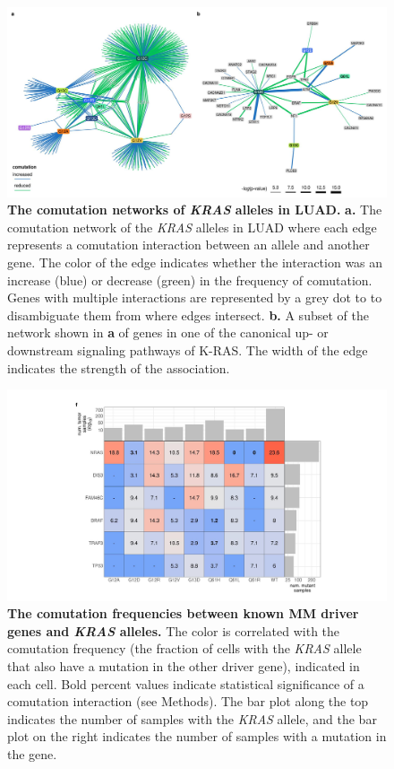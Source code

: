 \documentclass[english, 10pt, letterpaper]{article}
\newcommand{\KRAS}{\emph{KRAS}}
\newcommand{\kras}{K-RAS}
\begin{document}
\begin{figure}[h!]
\centering
\includegraphics[width=180mm]{figures/Supp_Fig_3.jpeg}
\caption{
    \textbf{The comutation networks of \KRAS{} alleles in LUAD.}
    \textbf{a.} The comutation network of the \KRAS{} alleles in LUAD where each edge represents a comutation interaction between an allele and another gene. The color of the edge indicates whether the interaction was an increase (blue) or decrease (green) in the frequency of comutation. Genes with multiple interactions are represented by a grey dot to to disambiguate them from where edges intersect.
    \textbf{b.} A subset of the network shown in \textbf{a} of genes in one of the canonical up- or downstream signaling pathways of \kras{}. The width of the edge indicates the strength of the association.
}
\label{sfig:luad-comutation-network}
\end{figure}
\newpage


\begin{figure}[h!]
\centering
\includegraphics[width=180mm]{figures/Supp_Fig_4.jpeg}
\caption{
    \textbf{The comutation frequencies between known MM driver genes and \KRAS{} alleles.} The color is correlated with the comutation frequency (the fraction of cells with the \KRAS{} allele that also have a mutation in the other driver gene), indicated in each cell. Bold percent values indicate statistical significance of a comutation interaction (see Methods). The bar plot along the top indicates the number of samples with the \KRAS{} allele, and the bar plot on the right indicates the number of samples with a mutation in the gene.
}
\label{sfig:mm-comutation-heatmap}
\end{figure}
\newpage
\end{document}
